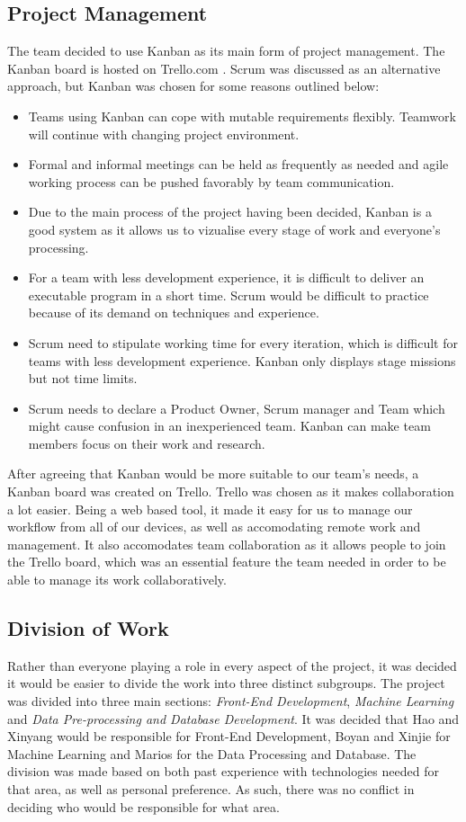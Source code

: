 \documentclass[a4paper,titlepage]{article}
\begin{document}
\subsection{Project Management}
The team decided to use Kanban as its main form of project management. The Kanban board is hosted on Trello.com \cite{trello}.
Scrum was discussed as an alternative approach, but Kanban was chosen for some reasons outlined below:

\begin{itemize}
\item Teams using Kanban can cope with mutable requirements flexibly. Teamwork will continue with changing project environment.
\item Formal and informal meetings can be held as frequently as needed and agile working process can be pushed favorably by team communication.
\item Due to the main process of the project having been decided, Kanban is a good system as it allows us to vizualise every stage of work and everyone’s processing.
\item For a team with less development experience, it is difficult to deliver an executable program in a short time. Scrum would be difficult to practice because of its demand on techniques and experience.
\item Scrum need to stipulate working time for every iteration, which is difficult for teams with less development experience. Kanban only displays stage missions but not time limits.
\item Scrum needs to declare a Product Owner, Scrum manager and Team which might cause confusion in an inexperienced team. Kanban can make team members focus on their work and research.
\end{itemize}

After agreeing that Kanban would be more suitable to our team's needs, a Kanban board was created on Trello. Trello was chosen as it makes collaboration a lot easier.
Being a web based tool, it made it easy for us to manage our workflow from all of our devices, as well as accomodating remote work and management.
It also accomodates team collaboration as it allows people to join the Trello board, which was an essential feature the team needed in order to be able to manage its work collaboratively.

\subsection{Division of Work\label{work_division}}
Rather than everyone playing a role in every aspect of the project, it was decided it would be easier to divide the work into three distinct subgroups.
The project was divided into three main sections: \textit{Front-End Development}, \textit{Machine Learning} and \textit{Data Pre-processing and Database Development}.
It was decided that Hao and Xinyang would be responsible for Front-End Development, Boyan and Xinjie for Machine Learning and Marios for the Data Processing and Database.
The division was made based on both past experience with technologies needed for that area, as well as personal preference.
As such, there was no conflict in deciding who would be responsible for what area.
\end{document}
